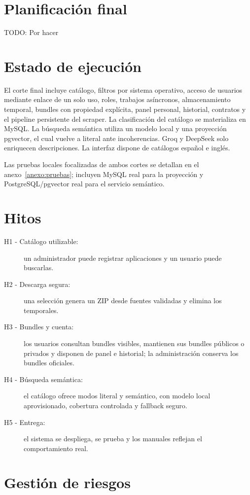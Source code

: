 \section{Planificación final}

TODO: Por hacer

\section{Estado de ejecución}

El corte final incluye catálogo, filtros por sistema operativo, acceso de usuarios mediante enlace de un solo uso, roles, trabajos asíncronos, almacenamiento temporal, bundles con propiedad explícita, panel personal, historial, contratos y el pipeline persistente del scraper. La clasificación del catálogo se materializa en MySQL. La búsqueda semántica utiliza un modelo local y una proyección pgvector, el cual vuelve a literal ante incoherencias. Groq y DeepSeek solo enriquecen descripciones. La interfaz dispone de catálogos español e inglés.

Las pruebas locales focalizadas de ambos cortes se detallan en el anexo~\ref{anexo:pruebas}; incluyen MySQL real para la proyección y PostgreSQL/pgvector real para el servicio semántico.

\section{Hitos}

\begin{description}
	\item[H1 - Catálogo utilizable:] un administrador puede registrar aplicaciones y un usuario puede buscarlas.
	\item[H2 - Descarga segura:] una selección genera un ZIP desde fuentes validadas y elimina los temporales.
	\item[H3 - Bundles y cuenta:] los usuarios consultan bundles visibles, mantienen sus bundles públicos o privados y disponen de panel e historial; la administración conserva los bundles oficiales.
	\item[H4 - Búsqueda semántica:] el catálogo ofrece modos literal y semántico, con modelo local aprovisionado, cobertura controlada y fallback seguro.
	\item[H5 - Entrega:] el sistema se despliega, se prueba y los manuales reflejan el comportamiento real.
\end{description}

\section{Gestión de riesgos}

